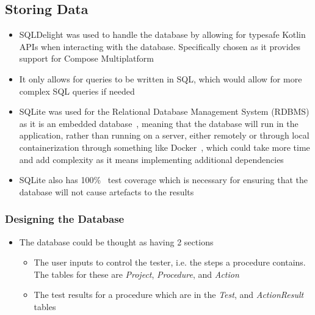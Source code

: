 \documentclass[../dissertation.tex]{subfiles}
\begin{document}

\subsection{Storing Data}
\begin{itemize}
  \item SQLDelight was used to handle the database by allowing for typesafe Kotlin APIs when interacting with the database.
    Specifically chosen as it provides support for Compose Multiplatform~\cite{sqldelight}
  \item It only allows for queries to be written in SQL, which would allow for more complex SQL queries if needed
  \item SQLite was used for the Relational Database Management System (RDBMS) as it is an embedded database~\cite{sqlite:about},
    meaning that the database will run in the application, rather than running on a server,
    either remotely or through local containerization through something like Docker~\cite{docker:container},
    which could take more time and add complexity as it means implementing additional dependencies
  \item SQLite also has 100\%~\cite{sqlite:tests} test coverage which is necessary for ensuring that the database will
    not cause artefacts to the results
\end{itemize}

\subsubsection{Designing the Database}
\begin{itemize}
  \item The database could be thought as having 2 sections
    \begin{itemize}
      \item The user inputs to control the tester, i.e. the steps a procedure contains.
        The tables for these are \textit{Project}, \textit{Procedure}, and \textit{Action}
      \item The test results for a procedure which are in the \textit{Test}, and \textit{ActionResult} tables
    \end{itemize}
\end{itemize}
\end{document}
